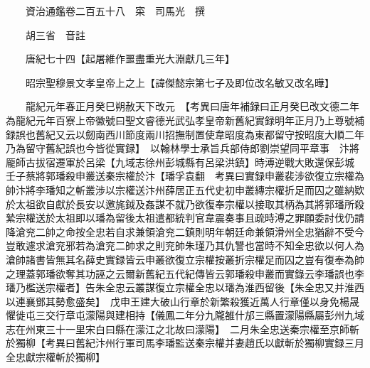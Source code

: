 










 


 
 


 

  
  
  
  
  





  
  
  
  
  
 
  

  

  
  
  



  

 
 

  
   




  

  
  


  　　資治通鑑卷二百五十八　寀　司馬光　撰

　　胡三省　音註

　　唐紀七十四【起屠維作噩盡重光大淵獻几三年】

　　昭宗聖穆景文孝皇帝上之上【諱傑懿宗第七子及即位改名敏又改名曄】

　　龍紀元年春正月癸巳朔赦天下改元　【考異曰唐年補録曰正月癸巳改文德二年為龍紀元年百寮上帝徽號曰聖文睿德光武弘孝皇帝新舊紀實録明年正月乃上尊號補録誤也舊紀又云以劒南西川節度兩川招撫制置使韋昭度為東都留守按昭度大順二年乃為留守舊紀誤也今皆從實録】　以翰林學士承旨兵部侍郎劉崇望同平章事　汴將龎師古拔宿遷軍於呂梁【九域志徐州彭城縣有呂梁洪鎮】時溥逆戰大敗還保彭城　壬子蔡將郭璠殺申叢送秦宗權於汴【璠孚袁翻　考異曰實録申叢裴涉欲復立宗權為帥汴將李璠知之斬叢涉以宗權送汴州薛居正五代史初申叢縳宗權折足而囚之雖納欵於太祖欲自獻於長安以邀旄鉞及姦謀不就乃欲復奉宗權以接取其柄為其將郭璠所殺縶宗權送於太祖即以璠為留後太祖遣都統判官韋震奏事且疏時溥之罪願委討伐仍請降滄兖二帥之命按全忠若自求兼領滄兖二鎮則明年朝廷命兼領滑州全忠猶辭不受今豈敢遽求滄兖邪若為滄兖二帥求之則兖帥朱瑾乃其仇讐也當時不知全忠欲以何人為滄帥諸書皆無其名薛史實録皆云申叢欲復立宗權按叢折宗權足而囚之豈有復奉為帥之理蓋郭璠欲奪其功誣之云爾新舊紀五代紀傳皆云郭璠殺申叢而實錄云李璠誤也李璠乃檻送宗權者】告朱全忠云叢謀復立宗權全忠以璠為淮西留後【朱全忠又并淮西以連襄鄧其勢愈盛矣】　戊申王建大破山行章於新繁殺獲近萬人行章僅以身免楊晟懼徙屯三交行章屯濛陽與建相持【儀鳳二年分九隴雒什邡三縣置濛陽縣屬彭州九域志在州東三十一里宋白曰縣在濛江之北故曰濛陽】　二月朱全忠送秦宗權至京師斬於獨柳【考異曰舊紀汴州行軍司馬李璠監送秦宗權并妻趙氏以獻斬於獨柳實録三月全忠獻宗權斬於獨柳】

